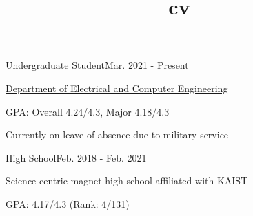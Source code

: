 \documentclass{cv}
\title{cv}
\begin{document}
\cvheader






{Undergraduate Student}{Mar. 2021 - Present}
{
    \item \href{http://ece.snu.ac.kr/en}{Department of Electrical and Computer Engineering}
    \item GPA: Overall 4.24/4.3, Major 4.18/4.3
    \item Currently on leave of absence due to military service
}
{High School}{Feb. 2018 - Feb. 2021}
{
    \item Science-centric magnet high school affiliated with KAIST
    \item GPA: 4.17/4.3 (Rank: 4/131)
}
\end{document}
